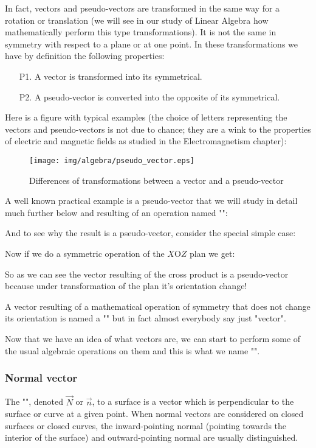 	In fact, vectors and pseudo-vectors are transformed in the same way for a rotation or translation (we will see in our study of Linear Algebra how mathematically perform this type transformations). It is not the same in symmetry with respect to a plane or at one point. In these transformations we have by definition the following properties:
	\begin{enumerate}
		\item[P1.] A vector is transformed into its symmetrical.
		\item[P2.] A pseudo-vector is converted into the opposite of its symmetrical.
	\end{enumerate}
	Here is a figure with typical examples (the choice of letters representing the vectors and pseudo-vectors is not due to chance; they are a wink to the properties of electric and magnetic fields as studied in the Electromagnetism chapter):
	\begin{figure}[H]
	\centering
	\texttt{[image: img/algebra/pseudo\_vector.eps]}
	\caption{Differences of transformations between a vector and a pseudo-vector}
	\end{figure}

A well known practical example is a pseudo-vector that we will study in detail much further below and resulting of an operation named ""\label{cross product}:
	
		And to see why the result is a pseudo-vector, consider the special simple case:
	
	Now if we do a symmetric operation of the $X\text{O}Z$ plan we get:
	
	So as we can see the vector resulting of the cross product is a pseudo-vector because under transformation of the plan it's orientation change!

A vector resulting of a mathematical operation of symmetry that does not change its orientation is named a "" but in fact almost everybody say just "vector".

Now that we have an idea of what vectors are, we can start to perform some of the usual algebraic operations on them and this is what we name "".

	\subsubsection{Normal vector}
	The "\label{normal vector}", denoted $\vec{N}$ or $\vec{n}$, to a surface is a vector which is perpendicular to the surface or curve at a given point. When normal vectors are considered on closed surfaces or closed curves, the inward-pointing normal (pointing towards the interior of the surface) and outward-pointing normal are usually distinguished.

